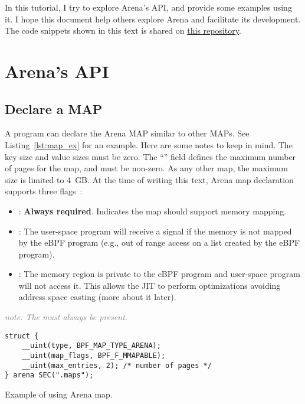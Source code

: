 \documentclass{article}
\begin{document}
In this tutorial, I try to explore Arena's API, and provide some examples using
it. I hope this document help others explore Arena and facilitate its
development. The code snippets shown in this text is shared on
\href{https://github.com/bpf-endeavor/ebpf-arena-tutorial}{this repository}.

\section{Arena's API}

\subsection{Declare a MAP}
A program can declare the Arena MAP similar to other MAPs. See Listing~\ref{lst:map_ex}
for an example. Here are some notes to keep in mind. The key size and value
sizes must be zero. The ``'' field defines the maximum number
of pages for the map, and must be non-zero. As any other map, the maximum size
is limited to 4~GB. At the time of writing this text, Arena map declaration
supports three flags~\cite{arena_source}:
\begin{itemize}
    \item {}: \textbf{Always required}. Indicates the map should
        support memory mapping.
    \item {}: The user-space program will receive a
         signal if the memory is not mapped by the eBPF program
        (e.g., out of range access on a list created by the eBPF program).
    \item {}: The memory region is private to the eBPF
        program and user-space program will not access it. This allows the JIT
        to perform optimizations avoiding address space casting (more about it
        later).
\end{itemize}
\textcolor{gray}{\textit{note: The  must always be present.}}

\centering
\begin{listing}
\begin{verbatim}
struct {
    __uint(type, BPF_MAP_TYPE_ARENA);
    __uint(map_flags, BPF_F_MMAPABLE);
    __uint(max_entries, 2); /* number of pages */
} arena SEC(".maps");
\end{verbatim}
    \caption{Example of using Arena map.}
    \label{lst:map_ex}
\end{listing}
\end{document}
